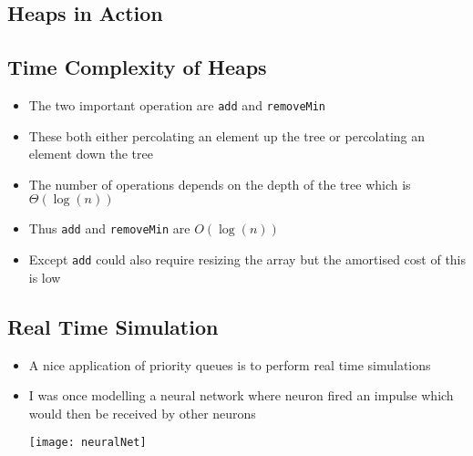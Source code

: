 
\begin{slide}
\section[-1]{Heaps in Action}
\pb\pause{}
\begin{center}
  \pause
\end{center}


\end{slide}

\begin{slide}
\section{Time Complexity of Heaps}

\begin{PauseHighLight}
  \begin{itemize}
  \item The two important operation are \texttt{add} and
    \texttt{removeMin}\pause
  \item These both either percolating an element up the tree or
    percolating an element down the tree\pause
  \item The number of operations depends on the depth of the tree which
    is $\Theta(\log(n))$\pause
  \item Thus \texttt{add} and \texttt{removeMin} are $O(\log(n))$\pause
  \item Except \texttt{add} could also require resizing the
  array\pause\nhl{,} but the amortised cost of this is low\pause
  \end{itemize}
\end{PauseHighLight}

\end{slide}




\begin{slide}
\section[-1]{Real Time Simulation}

\begin{PauseHighLight}
  \begin{itemize}
  \item A nice application of priority queues is to perform real time
    simulations\pause
  \item I was once modelling a neural network where neuron fired an
    impulse which would then be received by other neurons\pause
    \begin{center}
      \texttt{[image: neuralNet]}
    \end{center}
  \end{itemize}
\end{PauseHighLight}

\end{slide}

